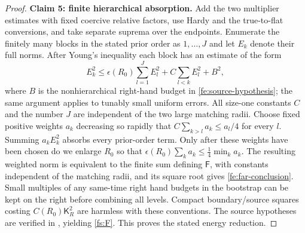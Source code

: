 \begin{proof}
\par\medskip\noindent\textbf{Claim 5: finite hierarchical absorption.}\quad
Add the two multiplier estimates with fixed coercive relative factors,
use Hardy and the true-to-flat conversions, and take separate suprema
over the endpoints.  Enumerate the finitely many blocks in the stated
prior order as $1,\ldots,J$ and let $E_k$ denote their full norms.
After Young's inequality each block has an estimate of the form
\begin{equation*}
 E_k^2\le \epsilon(R_0)\sum_{l=1}^JE_l^2
       +C\sum_{l<k}E_l^2+B^2,
\end{equation*}
where $B$ is the nonhierarchical right-hand budget in
\eqref{fe:source-hypothesis}; the same argument applies to tunably
small uniform errors.  All size-one constants $C$ and the number $J$
are independent of the two large matching radii.
Choose fixed positive weights $a_k$ decreasing so rapidly that
$C\sum_{k>l}a_k\le a_l/4$ for every $l$.
Summing $a_kE_k^2$ absorbs every prior-order term.
Only after these weights have been chosen do we enlarge $R_0$ so that
$\epsilon(R_0)\sum_k a_k\le\frac14\min_k a_k$.
The resulting weighted norm is equivalent to the finite sum defining
$\mathsf F$, with constants independent of the matching radii, and
its square root gives \eqref{fe:far-conclusion}. Small multiples of any same-time right hand budgets in the bootstrap can be kept on the right before combining all levels. Compact boundary/source squares costing \(C(R_0)\mathsf K_R^2\) are harmless with these conventions. The source hypotheses are verified in , yielding \eqref{fs:F}. This proves the stated energy reduction.
\end{proof}
